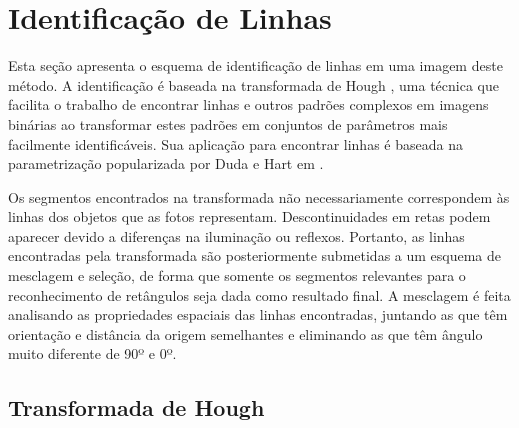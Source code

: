 \section{Identificação de Linhas} \label{met:linha}




Esta seção apresenta o esquema de identificação de linhas em uma imagem deste método. A identificação é baseada na transformada de Hough \cite{houghintro00}, uma técnica que facilita o trabalho de encontrar linhas e outros padrões complexos em imagens binárias ao transformar estes padrões em conjuntos de parâmetros mais facilmente identificáveis. Sua aplicação para encontrar linhas é baseada na parametrização popularizada por Duda e Hart em \cite{houghintro02}.

Os segmentos encontrados na transformada não necessariamente correspondem às linhas dos objetos que as fotos representam. Descontinuidades em retas podem aparecer devido a diferenças na iluminação ou reflexos. Portanto, as linhas encontradas pela transformada são posteriormente submetidas a um esquema de  mesclagem e seleção, de forma que somente os segmentos relevantes para o reconhecimento de retângulos seja dada como resultado final. A mesclagem é feita analisando as propriedades espaciais das linhas encontradas, juntando as que têm orientação e distância da origem semelhantes e eliminando as que têm ângulo muito diferente de 90º e 0º.

\subsection{Transformada de Hough}



